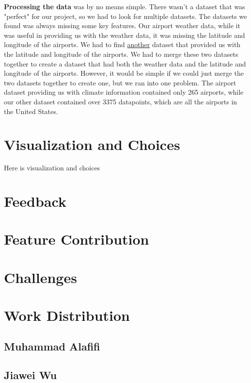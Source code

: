 \documentclass[9pt,twocolumn,twoside]{opticajnl}
\begin{document}
\textbf{Processing the data} was by no means simple. There wasn't a dataset that was "perfect" for our project, so we had to look for multiple datasets. The datasets we found was always missing some key features. Our airport weather data, while it was useful in providing us with the weather data, it was missing the latitude and longitude of the airports. We had to find \href{https://www.kaggle.com/datasets/nancyalaswad90/us-airports}{another} dataset that provided us with the latitude and longitude of the airports. We had to merge these two datasets together to create a dataset that had both the weather data and the latitude and longitude of the airports. However, it would be simple if we could just merge the two datasets together to create one, but we ran into one problem. The airport dataset providing us with climate information contained only 265 airports, while our other dataset contained over 3375 datapoints, which are all the airports in the United States.


\section {Visualization and Choices}

Here is visualization and choices

\section {Feedback}

\section {Feature Contribution}

\section {Challenges}

\section {Work Distribution}

\subsection {Muhammad Alafifi}

\subsection {Jiawei Wu}
\end{document}
